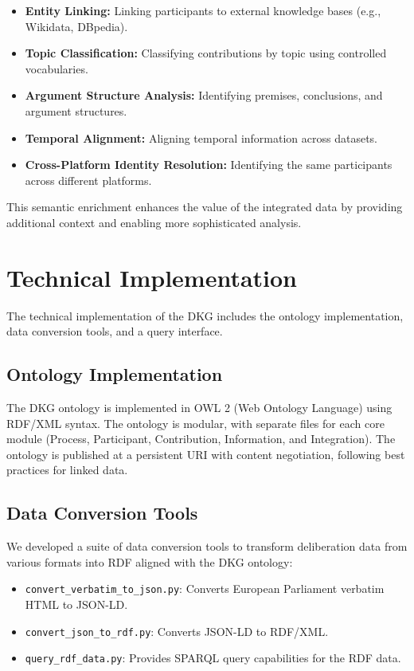 \documentclass[runningheads]{llncs}  %
\begin{document}
\begin{itemize}
    \item \textbf{Entity Linking:} Linking participants to external knowledge bases (e.g., Wikidata, DBpedia).
    \item \textbf{Topic Classification:} Classifying contributions by topic using controlled vocabularies.
    \item \textbf{Argument Structure Analysis:} Identifying premises, conclusions, and argument structures.
    \item \textbf{Temporal Alignment:} Aligning temporal information across datasets.
    \item \textbf{Cross-Platform Identity Resolution:} Identifying the same participants across different platforms.
\end{itemize}

This semantic enrichment enhances the value of the integrated data by providing additional context and enabling more sophisticated analysis.

\section{Technical Implementation}
The technical implementation of the DKG includes the ontology implementation, data conversion tools, and a query interface.

\subsection{Ontology Implementation}
The DKG ontology is implemented in OWL 2 (Web Ontology Language) using RDF/XML syntax. The ontology is modular, with separate files for each core module (Process, Participant, Contribution, Information, and Integration). The ontology is published at a persistent URI with content negotiation, following best practices for linked data.

\subsection{Data Conversion Tools}
We developed a suite of data conversion tools to transform deliberation data from various formats into RDF aligned with the DKG ontology:

\begin{itemize}
    \item \texttt{convert\_verbatim\_to\_json.py}: Converts European Parliament verbatim HTML to JSON-LD.
    \item \texttt{convert\_json\_to\_rdf.py}: Converts JSON-LD to RDF/XML.
    \item \texttt{query\_rdf\_data.py}: Provides SPARQL query capabilities for the RDF data.
\end{itemize}
\end{document}
